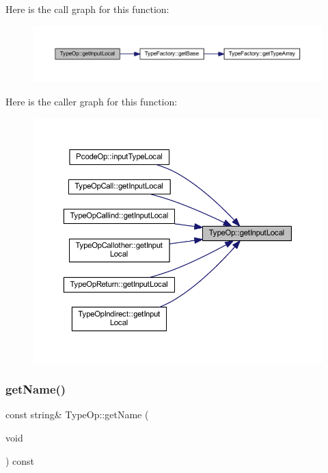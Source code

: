 Here is the call graph for this function\+:
\nopagebreak
\begin{figure}[H]
\begin{center}
\leavevmode
\includegraphics[width=350pt]{class_type_op_abe2e4b619932cf94bafb084963a0fc66_cgraph}
\end{center}
\end{figure}
Here is the caller graph for this function\+:
\nopagebreak
\begin{figure}[H]
\begin{center}
\leavevmode
\includegraphics[width=350pt]{class_type_op_abe2e4b619932cf94bafb084963a0fc66_icgraph}
\end{center}
\end{figure}
\mbox{\label{class_type_op_a66dc6a9447b6fb2482f2294ba0a2742b}} 
\subsubsection{\texorpdfstring{getName()}{getName()}}
{\footnotesize\ttfamily const string\& Type\+Op\+::get\+Name (\begin{DoxyParamCaption}\item[{void}]{ }\end{DoxyParamCaption}) const\hspace{0.3cm}{\ttfamily [inline]}}



